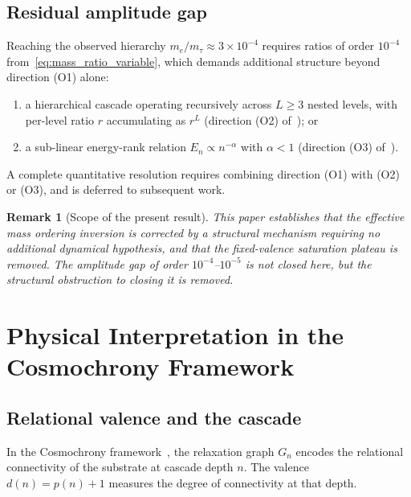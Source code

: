 \documentclass[11pt]{article}
\newtheorem{remark}[theorem]{Remark}
\begin{document}
  \subsection{Residual amplitude gap}
    \label{subsec:amplitude_gap}

    Reaching the observed hierarchy $m_e/m_\tau \approx 3 \times 10^{-4}$
    requires ratios of order $10^{-4}$ from~\eqref{eq:mass_ratio_variable},
    which demands additional structure beyond direction (O1) alone:
    \begin{enumerate}
      \item a hierarchical cascade operating recursively across $L \geq 3$ nested
      levels, with per-level ratio $r$ accumulating as $r^L$ (direction (O2)
      of~\cite{Beau2026a5}); or
      \item a sub-linear energy-rank relation $E_n \propto n^{-\alpha}$ with
      $\alpha < 1$ (direction (O3) of~\cite{Beau2026a5}).
    \end{enumerate}
    A complete quantitative resolution requires combining direction (O1) with (O2)
    or (O3), and is deferred to subsequent work.

    \begin{remark}[Scope of the present result]
      \label{rem:scope}
      This paper establishes that the effective mass ordering inversion is
      corrected by a structural mechanism requiring no additional dynamical
      hypothesis, and that the fixed-valence saturation plateau is removed.
      The amplitude gap of order $10^{-4}$--$10^{-5}$ is not closed here, but
      the structural obstruction to closing it is removed.
    \end{remark}

  \section{Physical Interpretation in the Cosmochrony Framework}
  \label{sec:physical}

  \subsection{Relational valence and the cascade}
    \label{subsec:valence_cascade}

    In the Cosmochrony framework~\cite{cosmochrony}, the relaxation graph $G_n$ encodes
    the relational connectivity of the substrate at cascade depth $n$.
    The valence $d(n) = p(n) + 1$ measures the degree of connectivity at that
    depth.
\end{document}
